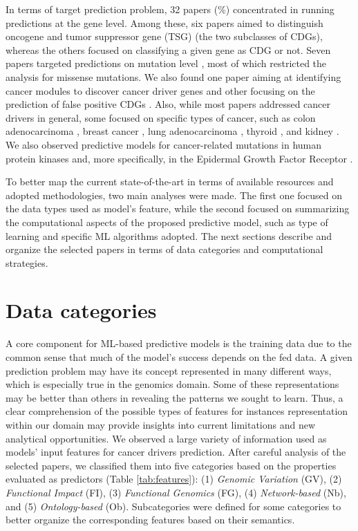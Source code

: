 In terms of target prediction problem, 32 papers (\%) concentrated in running predictions at the gene level. Among these, six papers \cite{Davoli2013, Gnad2015, Tavanaei2017, Chandrashekar2020, Colaprico2020, Lyu2020} aimed to distinguish oncogene and tumor suppressor gene (TSG) (\ie the two subclasses of CDGs), whereas the others focused on classifying a given gene as CDG or not. Seven papers targeted predictions on mutation level \cite{Mao2013, U2014, Soliman2015, Agajanian2018, Zhou2018, Agajanian2019, Wang2020}, most of which restricted the analysis for missense mutations. We also found one paper aiming at identifying cancer modules to discover cancer driver genes \cite{Manolakos2014} and other focusing on the prediction of false positive CDGs \cite{Cutigi2020}. Also, while most papers addressed cancer drivers in general, some focused on specific types of cancer, such as colon adenocarcinoma \cite{Fu2012, Luo2019}, breast cancer \cite{Celli2018, Lu2018, Luo2019}, lung adenocarcinoma \cite{Luo2019}, thyroid \cite{Celli2018}, and kidney \cite{Celli2018}. We also observed predictive models for cancer-related mutations in human protein kinases \cite{U2014} and, more specifically, in the Epidermal Growth Factor Receptor \cite{Anoosha2015}.

To better map the current state-of-the-art in terms of available resources and adopted methodologies, two main analyses were made. The first one focused on the data types used as model's feature, while the second focused on summarizing the computational aspects of the proposed predictive model, such as type of learning and specific ML algorithms adopted. The next sections describe and organize the selected papers in terms of data categories and computational strategies.


\section{Data categories}

A core component for ML-based predictive models is the training data due to the common sense that much of the model's success depends on the fed data. A given prediction problem may have its concept represented in many different ways, which is especially true in the genomics domain. Some of these representations may be better than others in revealing the patterns we sought to learn. Thus, a clear comprehension of the possible types of features for instances representation within our domain may provide insights into current limitations and new analytical opportunities.
We observed a large variety of information used as models' input features for cancer drivers prediction. After careful analysis of the selected papers, we classified them into five categories based on the properties evaluated as predictors (Table \ref{tab:features}): (1) \textit{Genomic Variation} (GV), (2) \textit{Functional Impact} (FI), (3) \textit{Functional Genomics} (FG), (4) \textit{Network-based} (Nb), and (5) \textit{Ontology-based} (Ob). Subcategories were defined for some categories to better organize the corresponding features based on their semantics.

